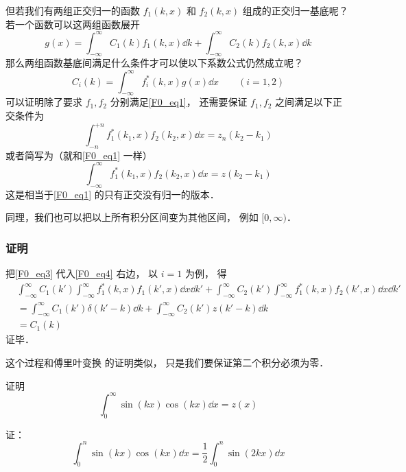 但若我们有两组正交归一的函数 $f_1(k, x)$ 和 $f_2(k, x)$ 组成的正交归一基底呢？ 若一个函数可以这两组函数展开
\begin{equation}\label{F0_eq3}
g(x) = \int_{-\infty}^{\infty} C_1(k) f_1(k, x) \dd{k} + \int_{-\infty}^{\infty} C_2(k) f_2(k, x) \dd{k}
\end{equation}
那么两组函数基底间满足什么条件才可以使以下系数公式仍然成立呢？
\begin{equation}\label{F0_eq4}
C_i(k) = \int_{-\infty}^{\infty} f_i^*(k, x)g(x)\dd{x} \qquad (i = 1,2)
\end{equation}
可以证明除了要求 $f_1, f_2$ 分别满足\autoref{F0_eq1}， 还需要保证 $f_1, f_2$ 之间满足以下正交条件为
\begin{equation}
\int_{-n}^{+n} f_1^*(k_1, x) f_2(k_2, x) \dd{x} = z_n(k_2 - k_1)
\end{equation}
或者简写为（就和\autoref{F0_eq1} 一样）
\begin{equation}
\int_{-\infty}^{\infty} f_1^*(k_1, x) f_2(k_2, x) \dd{x} = z(k_2 - k_1)
\end{equation}
这是相当于\autoref{F0_eq1} 的只有正交没有归一的版本．

同理，我们也可以把以上所有积分区间变为其他区间， 例如 $[0, \infty)$．

\subsubsection{证明}
把\autoref{F0_eq3} 代入\autoref{F0_eq4} 右边， 以 $i = 1$ 为例， 得
\begin{equation}
\begin{aligned}
&\int_{-\infty}^{\infty} C_1(k') \int_{-\infty}^{\infty} f_1^*(k, x) f_1(k', x)\dd{x} \dd{k'} + \int_{-\infty}^{\infty} C_2(k') \int_{-\infty}^{\infty} f_1^*(k, x)f_2(k', x)\dd{x} \dd{k'}\\
&= \int_{-\infty}^{\infty} C_1(k') \delta(k' - k) \dd{k} + \int_{-\infty}^{\infty} C_2(k') z(k' - k) \dd{k}\\
&= C_1(k)
\end{aligned}
\end{equation}
证毕．

这个过程和傅里叶变换 的证明类似， 只是我们要保证第二个积分必须为零．

\begin{example}{}
证明
\begin{equation}
\int_0^\infty \sin(kx)\cos(kx) \dd{x} = z(x)
\end{equation}

证：
\begin{equation}
\int_0^n \sin(kx)\cos(kx) \dd{x} = \frac{1}{2} \int_0^n \sin(2kx) \dd{x}
\end{equation}


\end{example}
